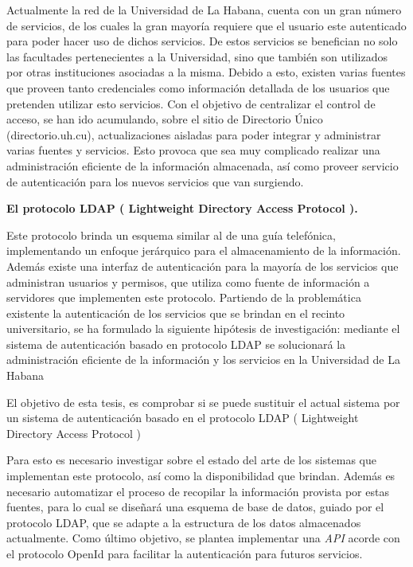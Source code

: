 \begin{introduction}
Actualmente la red de la Universidad de La Habana, cuenta con un gran número de servicios, de los cuales la gran mayoría requiere que el usuario este autenticado para poder hacer uso de dichos servicios. De estos servicios se benefician no solo las facultades pertenecientes a la Universidad, sino que también son utilizados por otras instituciones asociadas a la misma. Debido a esto, existen varias fuentes que proveen tanto credenciales como información detallada de los usuarios que pretenden utilizar esto servicios. Con el objetivo de centralizar el control de acceso, se han ido acumulando, sobre el sitio de Directorio Único (directorio.uh.cu), actualizaciones aisladas para poder integrar y administrar varias fuentes y servicios. Esto provoca que sea muy complicado realizar una administración eficiente de la información almacenada, así como proveer servicio de autenticación para los nuevos servicios que van surgiendo.

\textbf{El protocolo LDAP ( Lightweight Directory Access Protocol ).}

Este protocolo  brinda un esquema similar al de una guía telefónica, implementando un enfoque jerárquico para el almacenamiento de la información. Además existe una interfaz de autenticación para la mayoría de los servicios que administran usuarios y permisos, que utiliza como fuente de información a servidores que implementen este protocolo. 
Partiendo de la problemática existente la autenticación de los servicios que se brindan en el recinto universitario, se ha formulado la siguiente hipótesis de investigación: mediante el sistema de autenticación basado en protocolo LDAP se solucionará la administración eficiente de la información y los servicios en la Universidad de La Habana 

El objetivo de esta tesis, es comprobar si se puede sustituir el actual sistema por un sistema de autenticación basado en el protocolo LDAP ( Lightweight Directory Access Protocol )

Para esto es necesario investigar sobre el estado del arte de los sistemas que implementan este protocolo, así como la disponibilidad que brindan. Además es necesario automatizar el proceso de recopilar la información provista por estas fuentes, para lo cual se diseñará una esquema de base de datos, guiado por el protocolo LDAP, que se adapte a la estructura de los datos almacenados actualmente. Como último objetivo, se plantea implementar una \textit{API} acorde con el protocolo OpenId para facilitar la autenticación para futuros servicios.

\end{introduction} 